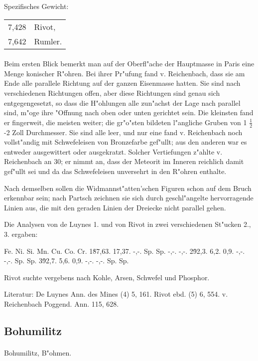 \documentclass[a4paper, 11pt, oneside]{article}
\begin{document}
Spezifisches Gewicht:  
\begin{table}[!ht]
    \centering
    \begin{tabular}{l l}
        7,428 & Rivot,\\
        7,642 & Rumler.
    \end{tabular}
\end{table}
\paragraph{}
Beim ersten Blick bemerkt man auf der Oberfl"ache der Hauptmasse in Paris eine Menge konischer R"ohren. Bei ihrer Pr"ufung fand v. Reichenbach, dass sie am Ende alle parallele Richtung auf der ganzen Eisenmasse hatten. Sie sind nach verschiedenen Richtungen offen, aber diese Richtungen sind genau sich entgegengesetzt, so dass die H"ohlungen alle zun"achst der Lage nach parallel sind, m"oge ihre "Offnung nach oben oder unten gerichtet sein. Die kleinsten fand er fingerweit, die meisten weiter; die gr"o"sten bildeten l"angliche Gruben von 1 $\frac{1}{2}$-2 Zoll Durchmesser. Sie sind alle leer, und nur eine fand v. Reichenbach noch vollst"andig mit Schwefeleisen von Bronzefarbe gef"ullt; aus den anderen war es entweder ausgewittert oder ausgekratzt. Solcher Vertiefungen z"ahlte v. Reichenbach an 30; er nimmt an, dass der Meteorit im Inneren reichlich damit gef"ullt sei und da das Schwefeleisen unversehrt in den R"ohren enthalte.

Nach demselben sollen die Widmannst"atten'schen Figuren schon auf dem Bruch erkennbar sein; nach Partsch zeichnen sie sich durch geschl"angelte hervorragende Linien aus, die mit den geraden Linien der Dreiecke nicht parallel gehen.

Die Analysen von de Luynes 1. und von Rivot in zwei verschiedenen St"ucken 2., 3. ergaben:

Fe. Ni. Si. Mn. Cu. Co. Cr.  
1\. 87,63. 17,37. -,-. Sp. Sp. -,-. -,-.  
2\. 92,3. 6,2. 0,9. -,-. -,-. Sp. Sp.  
3\. 92,7. 5,6. 0,9. -,-. -,-. Sp. Sp.

Rivot suchte vergebens nach Kohle, Arsen, Schwefel und Phosphor.

Literatur: De Luynes Ann. des Mines (4) 5, 161. Rivot ebd. (5) 6, 554. v. Reichenbach Poggend. Ann. 115, 628.

\subsection{Bohumilitz}
\normalsize
\paragraph{}
Bohumilitz, B"ohmen.
\end{document}
